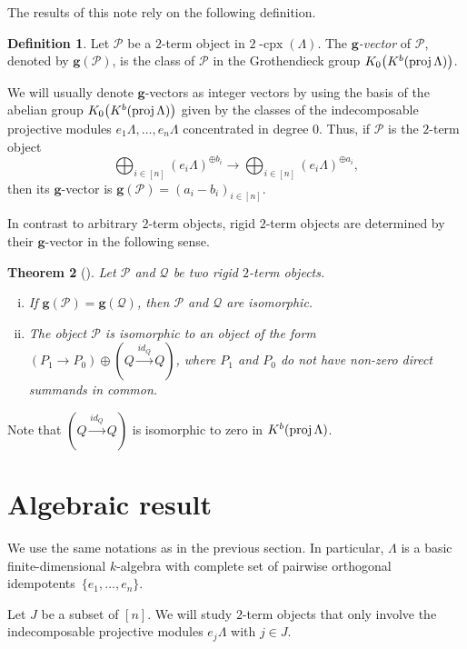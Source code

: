 \documentclass{amsart}
\newtheorem{theorem}{Theorem}%
\theoremstyle{definition}
\newtheorem{definition}[theorem]{Definition}
\renewcommand{\b}[1]{\mathbf{#1}} %
\newcommand{\darkblue}{\color{darkblue}} %
\newcommand{\defn}[1]{\textsl{\darkblue #1}} %
\newcommand{\complexP}{\mathcal{P}} %
\newcommand{\complexQ}{\mathcal{Q}} %
\newcommand{\cpx}{2 \! \operatorname{-cpx}}
\newcommand{\proj}{\operatorname{{\rm proj }}}
\begin{document}
The results of this note rely on the following definition.

\begin{definition}
 Let $\complexP$ be a $2$-term object in $\cpx(\Lambda)$. 
 The \defn{$\b{g}$-vector} of $\complexP$, denoted by $\b{g}(\complexP)$, is the class of $\complexP$ in the Grothendieck group $K_0\big(K^b(\proj \Lambda)\big)$.
\end{definition}
We will usually denote $\b{g}$-vectors as integer vectors by using the basis of the abelian group $K_0\big(K^b(\proj \Lambda)\big)$
given by the classes of the indecomposable projective modules $e_1 \Lambda, \dots, e_n \Lambda$ concentrated in degree $0$.
Thus, if $\complexP$ is the $2$-term object
\[
 \bigoplus_{i \in [n]} (e_i \Lambda)^{\oplus b_i} \xrightarrow{} \bigoplus_{i \in [n]} (e_i \Lambda)^{\oplus a_i},
\]
then its $\b{g}$-vector is $\b{g}(\complexP) = (a_i - b_i)_{i \in [n]}$.

In contrast to arbitrary $2$-term objects, rigid $2$-term objects are determined by their $\b{g}$-vector in the following sense.

\begin{theorem}[{\cite[Sec.~2.3 \& 2.4]{DehyKeller}}]
Let $\complexP$ and $\complexQ$ be two rigid $2$-term objects. 
\begin{enumerate}[(i)]
  \item If ${\b{g}(\complexP) = \b{g}(\complexQ)}$, then $\complexP$ and $\complexQ$ are isomorphic.
  
  \item The object $\complexP$ is isomorphic to an object of the form $(P_1\to P_0) \oplus (Q\stackrel{id_Q}{\to} Q)$,
    where $P_1$ and $P_0$ do not have non-zero direct summands in common.
 \end{enumerate}
\end{theorem}
Note that $(Q\stackrel{id_Q}{\to} Q)$ is isomorphic to zero in $K^b(\proj \Lambda)$.


\section{Algebraic result}\label{sec:algRes}

We use the same notations as in the previous section.  In particular, $\Lambda$ is a basic finite-dimensional $k$-algebra
with complete set of pairwise orthogonal idempotents~$\{e_1, \dots, e_n\}$.

Let $J$ be a subset of $[n]$.  
We will study $2$-term objects that only involve the indecomposable projective modules $e_j \Lambda$ with $j\in J$.
\end{document}
